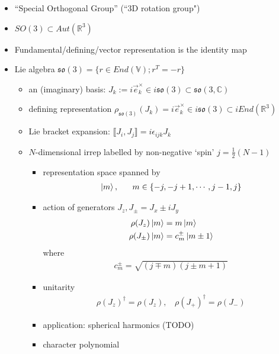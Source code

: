 \documentclass[11pt]{article}
\newcommand{\R}{\mathbb{R}}
\begin{document}
\begin{itemize}
    \item ``Special Orthogonal Group'' (``3D rotation group")
    \item $SO(3) \subset Aut(\R^3)$
    \item Fundamental/defining/vector representation is the identity map
    \item Lie algebra $ \mathfrak{so}(3) = \{ r \in End(\mathbb{V}); r^T = -r \}$
        \begin{itemize}
            \item an (imaginary) basis: $J_k := i\vec{e}^\times_k \in i \mathfrak{so}(3) \subset \mathfrak{so}(3, \mathbb{C})$ 
            \item defining representation $\rho_{\mathfrak{so}(3)}(J_k) = i \vec{e}_k^\times \in i \mathfrak{so}(3) \subset iEnd(\mathbb{R}^3)$ 
            \item Lie bracket expansion: $\llbracket J_i, J_j \rrbracket = i \epsilon_{ijk}J_k$ 
            \item $N$-dimensional irrep labelled by non-negative `spin' $j = \frac{1}{2}(N-1)$
            \begin{itemize}
                \item representation space spanned by 
                \begin{align*}
                    \ket{m},~~~~~ m \in \{-j, -j +1, \cdots, j -1, j \}
                \end{align*}
                \item action of generators $J_z, J_{\pm} = J_x \pm i J_y$ 
                \begin{align*}
                    \rho(J_z) \ket{m} &= m \ket{m} \\
                    \rho(J_\pm) \ket{m} &= c_m^\pm \ket{m \pm 1}
                \end{align*}
                where 
                \begin{align*}
                    c_m^\pm = \sqrt{(j \mp m)(j \pm m +1)}
                \end{align*}
                \item unitarity 
                \begin{align*}
                    \rho(J_z)^\dagger = \rho(J_z), ~~~~ \rho(J_+)^\dagger = \rho(J_-)
                \end{align*}
                \item application: spherical harmonics (TODO)
                \item character polynomial

\end{itemize}
\end{itemize}
\end{itemize}
\end{document}
